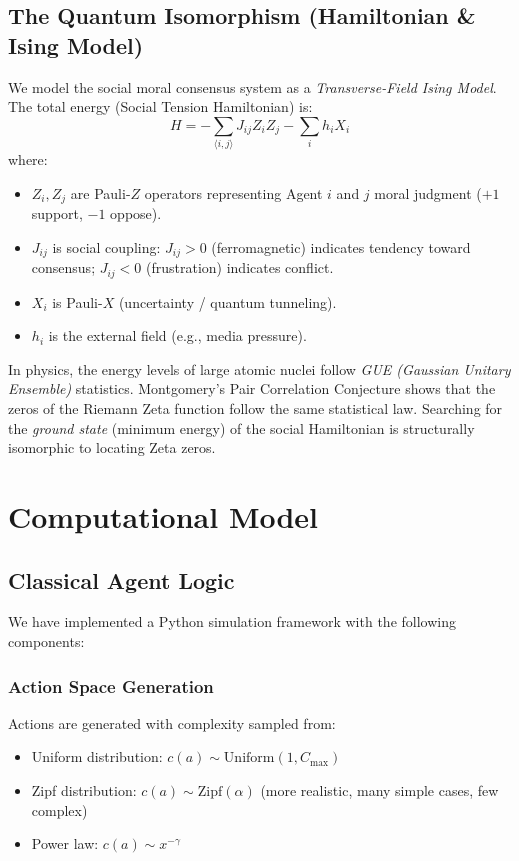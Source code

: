 \documentclass[12pt,a4paper]{article}
\theoremstyle{definition}
\theoremstyle{remark}
\begin{document}
\subsection{The Quantum Isomorphism (Hamiltonian \& Ising Model)}
\label{sec:quantum-isomorphism}

We model the social moral consensus system as a \emph{Transverse-Field Ising Model}. The total energy (Social Tension Hamiltonian) is:
\[
H = -\sum_{\langle i,j \rangle} J_{ij} Z_i Z_j - \sum_{i} h_i X_i
\]
where:
\begin{itemize}
    \item $Z_i, Z_j$ are Pauli-$Z$ operators representing Agent $i$ and $j$ moral judgment ($+1$ support, $-1$ oppose).
    \item $J_{ij}$ is social coupling: $J_{ij} > 0$ (ferromagnetic) indicates tendency toward consensus; $J_{ij} < 0$ (frustration) indicates conflict.
    \item $X_i$ is Pauli-$X$ (uncertainty / quantum tunneling).
    \item $h_i$ is the external field (e.g., media pressure).
\end{itemize}

In physics, the energy levels of large atomic nuclei follow \emph{GUE (Gaussian Unitary Ensemble)} statistics. Montgomery's Pair Correlation Conjecture shows that the zeros of the Riemann Zeta function follow the same statistical law. Searching for the \emph{ground state} (minimum energy) of the social Hamiltonian is structurally isomorphic to locating Zeta zeros.

\section{Computational Model}
\label{sec:framework}

\subsection{Classical Agent Logic}
\label{sec:classical-agent}

We have implemented a Python simulation framework with the following components:

\subsubsection{Action Space Generation}

Actions are generated with complexity sampled from:
\begin{itemize}
    \item Uniform distribution: $c(a) \sim \text{Uniform}(1, C_{\max})$
    \item Zipf distribution: $c(a) \sim \text{Zipf}(\alpha)$ (more realistic, many simple cases, few complex)
    \item Power law: $c(a) \sim x^{-\gamma}$
\end{itemize}
\end{document}
